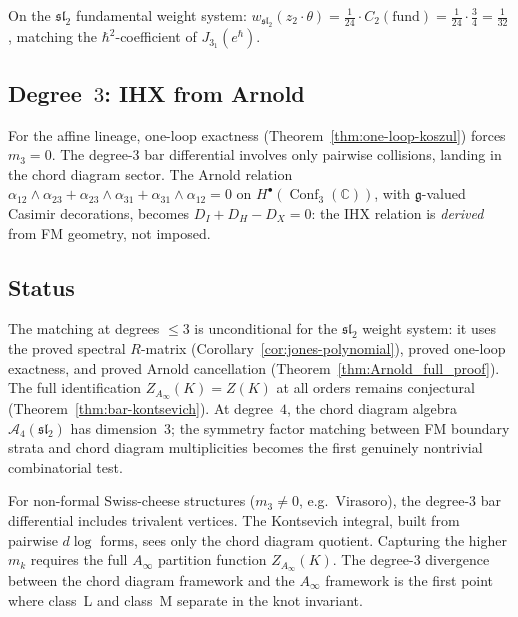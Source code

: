 \documentclass[11pt]{article}
\newcommand{\cA}{\mathcal{A}}
\newcommand{\fg}{\mathfrak{g}}
\newcommand{\fsl}{\mathfrak{sl}}
\newcommand{\C}{\mathbb{C}}
\DeclareMathOperator{\Conf}{Conf}
\begin{document}
On the $\fsl_2$ fundamental weight system:
$w_{\fsl_2}(z_2 \cdot \theta) = \frac{1}{24} \cdot
C_2(\mathrm{fund}) = \frac{1}{24} \cdot \frac{3}{4} =
\frac{1}{32}$, matching the $\hbar^2$-coefficient of
$J_{3_1}(e^\hbar)$.

\subsection*{Degree~$3$: IHX from Arnold}

For the affine lineage, one-loop exactness
(Theorem~\ref{thm:one-loop-koszul}) forces $m_3 = 0$.
The degree-$3$ bar differential involves only pairwise
collisions, landing in the chord diagram sector.  The Arnold
relation
$\alpha_{12} \wedge \alpha_{23} + \alpha_{23} \wedge
\alpha_{31} + \alpha_{31} \wedge \alpha_{12} = 0$
on $H^\bullet(\Conf_3(\C))$, with $\fg$-valued Casimir
decorations, becomes $D_I + D_H - D_X = 0$: the IHX
relation is \emph{derived} from FM geometry, not imposed.

\subsection*{Status}

The matching at degrees $\le 3$ is unconditional for the
$\fsl_2$ weight system: it uses the proved spectral $R$-matrix
(Corollary~\ref{cor:jones-polynomial}), proved one-loop
exactness, and proved Arnold cancellation
(Theorem~\ref{thm:Arnold_full_proof}).  The full identification
$Z_{A_\infty}(K) = Z(K)$ at all orders remains conjectural
(Theorem~\ref{thm:bar-kontsevich}).  At degree~$4$, the chord
diagram algebra $\cA_4(\fsl_2)$ has dimension~$3$; the symmetry
factor matching between FM boundary strata and chord diagram
multiplicities becomes the first genuinely nontrivial
combinatorial test.

\begin{question}
\label{q:trefoil-beyond-affine}
For non-formal Swiss-cheese structures ($m_3 \ne 0$, e.g.\
Virasoro), the degree-$3$ bar differential includes trivalent
vertices.  The Kontsevich integral, built from pairwise $d\log$
forms, sees only the chord diagram quotient.  Capturing the
higher $m_k$ requires the full $A_\infty$ partition function
$Z_{A_\infty}(K)$.  The degree-$3$ divergence between the
chord diagram framework and the $A_\infty$ framework is
the first point where class~L and class~M separate in the
knot invariant.
\end{question}
\end{document}
